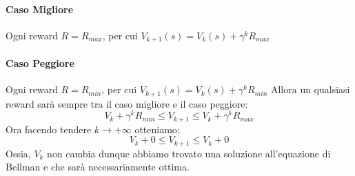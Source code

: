 \paragraph{Caso Migliore}Ogni reward $R = R_{max}$, per cui $V_{k+1}(s) = V_k(s) + \gamma^k R_{max}$
\paragraph{Caso Peggiore}Ogni reward $R = R_{min}$, per cui $V_{k+1}(s) = V_k(s) + \gamma^k R_{min}$
Allora un qualsiasi reward sarà sempre tra il caso migliore e il caso peggiore:
\begin{equation}
    V_k + \gamma^k R_{min} \leq V_{k+1} \leq V_k + \gamma^k R_{max}
\end{equation}
Ora facendo tendere $k \rightarrow +\infty$ otteniamo:
\begin{equation}
    V_k + 0 \leq V_{k+1} \leq V_k + 0
\end{equation}
Ossia, $V_k$ non cambia dunque abbiamo trovato una soluzione all'equazione di Bellman e che sarà necessariamente ottima.